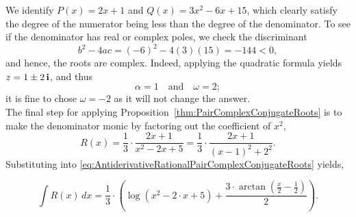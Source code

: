 We identify $P(x) = 2x+1$ and $Q(x) = 3 x^2 -6 x +15$, which clearly satisfy the degree of the numerator being less than the degree of the denominator. To see if the denominator has real or complex poles, we check the discriminant
$$b^2 - 4 ac = (-6)^2 - 4(3)(15) = -144 < 0,$$ 
and hence, the roots are complex. Indeed, applying the quadratic formula yields $z=1 \pm 2\mathop{\bm{\mathrm i}}$, and thus
$$\alpha=1 \quad \text{and} \quad \omega = 2;$$
it is fine to chose $\omega = -2$ as it will not change the answer.\\

The final step for applying Proposition~\ref{thm:PairComplexConjugateRoots} is to make the denominator monic by factoring out the coefficient of $x^2$,
$$R(x) = \frac{1}{3} \cdot \frac{2 x + 1}{x^2 - 2 x + 5}=  \frac{1}{3} \cdot \frac{2 x + 1}{(x-1)^2 + 2^2}.$$
Substituting into \eqref{eq:AntiderivativeRationalPairComplexConjugateRoots} yields,

$$\int R(x)\, dx = \frac{1}{3} \cdot \left(\log\left( x^{2} - 2 \cdot x + 5 \right) + \frac{3 \cdot \arctan\left( \frac{x}{2} - \frac{1}{2} \right)}{2} \right).$$
\Qed


   
   



